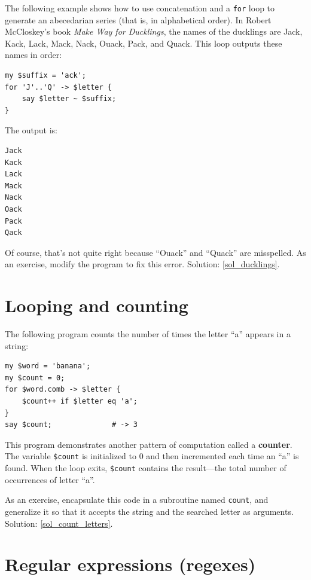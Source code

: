 The following example shows how to use concatenation and a 
{\tt for} loop to generate an abecedarian series (that is, in
alphabetical order).  In Robert McCloskey's book {\em Make
Way for Ducklings}, the names of the ducklings are Jack, Kack, Lack,
Mack, Nack, Ouack, Pack, and Quack.  This loop outputs these names in
order:

\begin{verbatim}
my $suffix = 'ack';
for 'J'..'Q' -> $letter {
    say $letter ~ $suffix;
}
\end{verbatim}
%
The output is:

\begin{verbatim}
Jack
Kack
Lack
Mack
Nack
Oack
Pack
Qack
\end{verbatim}
%
Of course, that's not quite right because ``Ouack'' and 
``Quack'' are misspelled.  As an exercise, modify the program 
to fix this error. Solution: \ref{sol_ducklings}.


\section{Looping and counting}
\label{counter}

The following program counts the number of times the 
letter ``a'' appears in a string:

\begin{verbatim}
my $word = 'banana';
my $count = 0;
for $word.comb -> $letter {
    $count++ if $letter eq 'a';
}
say $count;              # -> 3
\end{verbatim}
%

This program demonstrates another pattern of computation called a {\bf
counter}.  The variable \verb'$count' is initialized to 0 and then
incremented each time an ``a'' is found. When the loop exits, 
\verb'$count' contains the result---the total number of 
occurrences of letter ``a''.

As an exercise, encapsulate this code in a subroutine named 
{\tt count}, and generalize it so that it accepts the string
and the searched letter as arguments. Solution: \ref{sol_count_letters}.
\label{count_letters}

\section{Regular expressions (regexes)}
\label{regex}

